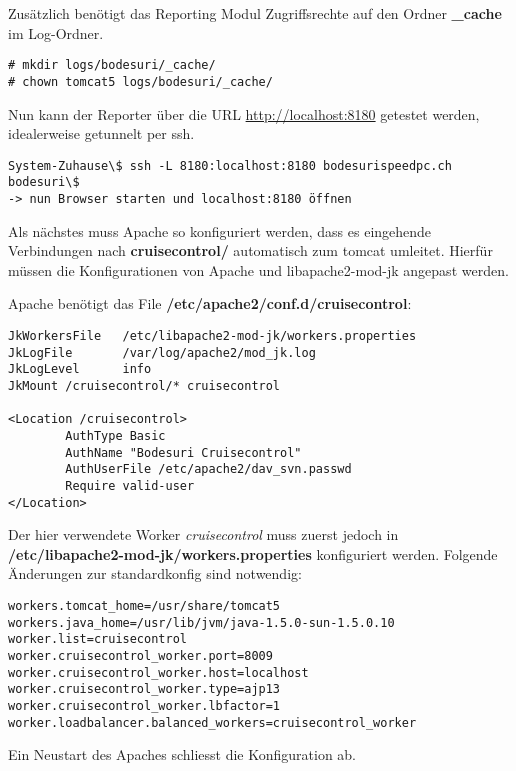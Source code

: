 \documentclass[12pt,halfparskip]{scrreprt}
\begin{document}
Zusätzlich benötigt das Reporting Modul Zugriffsrechte auf den Ordner \textbf{\_cache} im Log-Ordner.

\begin{verbatim}
# mkdir logs/bodesuri/_cache/
# chown tomcat5 logs/bodesuri/_cache/
\end{verbatim}

Nun kann der Reporter über die URL \url{http://localhost:8180} getestet werden, idealerweise getunnelt per ssh.

\begin{verbatim}
System-Zuhause\$ ssh -L 8180:localhost:8180 bodesurispeedpc.ch
bodesuri\$
-> nun Browser starten und localhost:8180 öffnen
\end{verbatim}

Als nächstes muss Apache so konfiguriert werden, dass es eingehende Verbindungen nach \textbf{cruisecontrol/} automatisch zum tomcat umleitet. Hierfür müssen die Konfigurationen von Apache und libapache2-mod-jk angepast werden.

Apache benötigt das File \textbf{/etc/apache2/conf.d/cruisecontrol}:

\begin{verbatim}
JkWorkersFile   /etc/libapache2-mod-jk/workers.properties
JkLogFile       /var/log/apache2/mod_jk.log
JkLogLevel      info
JkMount /cruisecontrol/* cruisecontrol

<Location /cruisecontrol>
        AuthType Basic
        AuthName "Bodesuri Cruisecontrol"
        AuthUserFile /etc/apache2/dav_svn.passwd
        Require valid-user
</Location>
\end{verbatim}

Der hier verwendete Worker \emph{cruisecontrol} muss zuerst jedoch in \textbf{ /etc/libapache2-mod-jk/workers.properties} konfiguriert werden. Folgende Änderungen zur standardkonfig sind notwendig:

\begin{verbatim}
workers.tomcat_home=/usr/share/tomcat5
workers.java_home=/usr/lib/jvm/java-1.5.0-sun-1.5.0.10
worker.list=cruisecontrol
worker.cruisecontrol_worker.port=8009
worker.cruisecontrol_worker.host=localhost
worker.cruisecontrol_worker.type=ajp13
worker.cruisecontrol_worker.lbfactor=1
worker.loadbalancer.balanced_workers=cruisecontrol_worker
\end{verbatim}

Ein Neustart des Apaches schliesst die Konfiguration ab.

\end{document}

